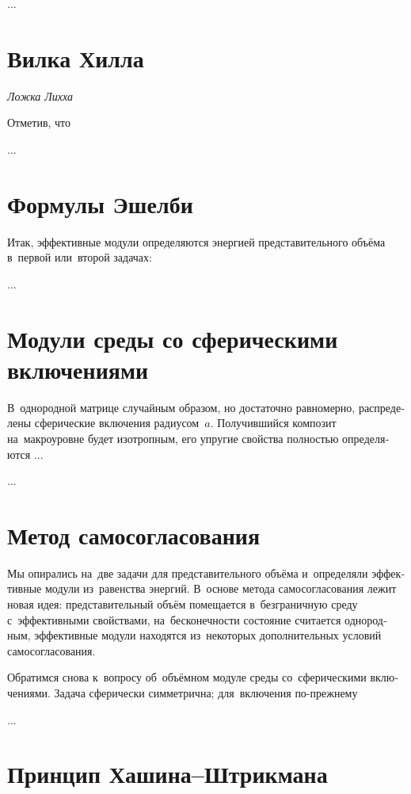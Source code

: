 \begin{otherlanguage}{russian}
...



\section{Вилка Хилла}

\emph{Ложка Лихха}

Отметив, что

...



\section{Формулы Эшелби}

Итак, эффективные модули определяются энергией представительного объёма в~первой или~второй задачах:

...



\section{Модули среды со сферическими включениями} %

В~однородной матрице случайным образом, но достаточно равномерно, распределены сферические включения радиусом~$a$. Получившийся композит на~макроуровне будет изотропным, его упругие свойства полностью определяются ...

...


\section{Метод самосогласования}

Мы опирались на~две задачи для представительного объёма и~определяли эффективные модули из~равенства энергий. В~\hbox{основе} метода самосогласования лежит новая идея: представительный объём помещается в~безграничную среду с~эффективными свойствами, на~бесконечности состояние считается однородным, эффективные модули находятся из~некоторых дополнительных условий самосогласования.

Обратимся снова к~вопросу об~объёмном модуле среды со~сферическими включениями. Задача сферически симметрична; для~включения по\hbox{-}прежнему

...


\section{Принцип Хашина\hbox{--}Штрикмана}


\end{otherlanguage}
